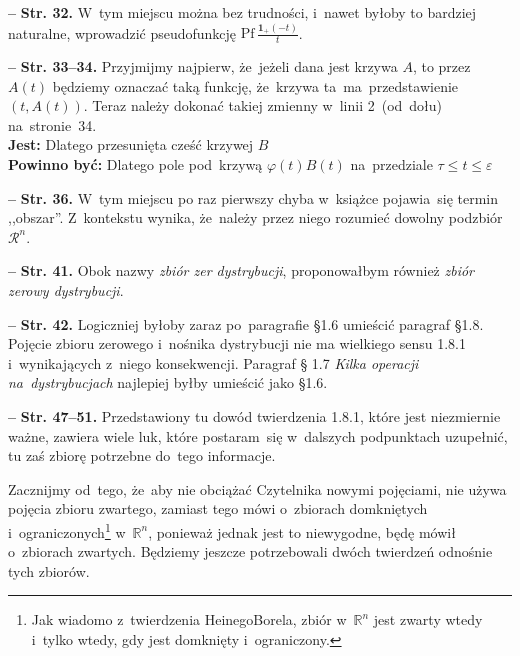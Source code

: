 \documentclass[a4paper,11pt]{article}
\newcommand{\spaceThree}{0.5em}
\newcommand{\fr}{\frac}
\newcommand{\mr}{\mathrm}
\newcommand{\mb}{\mathbb}
\newcommand{\mc}{\mathcal}
\newcommand{\mbf}{\mathbf}
\newcommand{\wtw}{wtedy i~tylko wtedy}
\newcommand{\veps}{\varepsilon}
\newcommand{\vp}{\varphi}
\newcommand{\R}{\mb{R}}
\newcommand{\Rn}{\R^{ n }}
\newcommand{\Rc}{\mc{R}}
\newcommand{\tb}{\textbf}
\newcommand{\noi}{\noindent}
\newcommand{\start}{\noi \tb{--} {}}
\newcommand{\Str}[1]{\tb{Str. #1.}}
\newcommand{\Jest}{\tb{Jest: }}
\newcommand{\Pow}{\tb{Powinno być: }}
\newcommand{\Pf}{\mr{Pf}\,}
\newcommand{\Rnc}{\Rc^{ n }}
\newcommand{\Hevp}{\mbf{1}_{ + }} %
\begin{document}
\vspace{\spaceThree}


\start \Str{32} W~tym miejscu można bez trudności, i~nawet byłoby to
bardziej naturalne, wprowadzić pseudofunkcję
$\Pf \fr{ \Hevp( -t )}{ t }$.

\vspace{\spaceThree}


\start \Str{33--34} Przyjmijmy najpierw, że~jeżeli dana jest krzywa
$A$, to przez $A( t )$ będziemy oznaczać taką funkcję, że~krzywa
ta~ma~przedstawienie $( t, A( t ) )$. Teraz należy dokonać takiej
zmienny w~linii 2~(od~dołu) na~stronie~34. \\
\Jest Dlatego przesunięta cześć krzywej $B$ \\
\Pow Dlatego pole pod~krzywą $\vp( t ) B( t )$ na~przedziale
$\tau \leq t \leq \veps$

\vspace{\spaceThree}


\start \Str{36} W~tym miejscu po raz pierwszy chyba w~książce
pojawia~się termin ,,obszar''. Z~kontekstu wynika, że~należy przez
niego rozumieć dowolny podzbiór $\Rnc$.

\vspace{\spaceThree}


\start \Str{41} Obok nazwy \emph{zbiór zer dystrybucji}, proponowałbym
również \emph{zbiór zerowy dystrybucji}.

\vspace{\spaceThree}


\start \Str{42} Logiczniej byłoby zaraz po~paragrafie \S 1.6 umieścić
paragraf \S 1.8. Pojęcie zbioru zerowego i~nośnika dystrybucji nie ma
wielkiego sensu 1.8.1 i~wynikających z~niego konsekwencji. Paragraf \S
1.7 \emph{Kilka operacji na~dystrybucjach} najlepiej byłby umieścić
jako \S 1.6.

\vspace{\spaceThree}


\start \Str{47--51} Przedstawiony tu dowód twierdzenia 1.8.1, które
jest niezmiernie ważne, zawiera wiele luk, które postaram~się
w~dalszych podpunktach uzupełnić, tu zaś zbiorę potrzebne do~tego
informacje.

Zacznijmy od~tego, że~aby nie obciążać Czytelnika nowymi pojęciami,
nie używa pojęcia zbioru zwartego, zamiast tego mówi o~zbiorach
domkniętych i~ograniczonych\footnote{Jak wiadomo z~twierdzenia
  Heinego\dywiz Borela, zbiór w~$\Rn$ jest zwarty \wtw, gdy jest
  domknięty i~ograniczony.} w~$\Rn$, ponieważ jednak jest to
niewygodne, będę mówił o~zbiorach zwartych. Będziemy jeszcze
potrzebowali dwóch twierdzeń odnośnie tych zbiorów.
\end{document}
